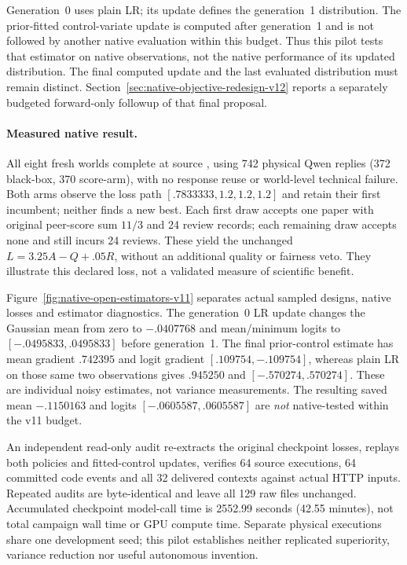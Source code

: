 Generation~0 uses plain LR; its update defines the generation~1 distribution.
The prior-fitted control-variate update is computed after generation~1 and is
not followed by another native evaluation within this budget. Thus this pilot
tests that estimator on native observations, not the native performance of its
updated distribution. The final computed update and the last evaluated
distribution must remain distinct. Section~\ref{sec:native-objective-redesign-v12}
reports a separately budgeted forward-only followup of that final proposal.

\paragraph{Measured native result.}
All eight fresh worlds complete at source , using 742 physical
Qwen replies (372 black-box, 370 score-arm), with no response reuse or
world-level technical failure. Both arms observe the loss path
$[.7833333,1.2,1.2,1.2]$ and retain their first incumbent; neither finds a new
best. Each first draw accepts one paper with original peer-score sum $11/3$
and 24 review records; each remaining draw accepts none and still incurs 24
reviews. These yield the unchanged $L=3.25A-Q+.05R$, without an additional
quality or fairness veto. They illustrate this declared loss, not a validated
measure of scientific benefit.

Figure~\ref{fig:native-open-estimators-v11} separates actual sampled designs,
native losses and estimator diagnostics. The generation~0 LR update changes
the Gaussian mean from zero to $-.0407768$ and mean/minimum logits to
$[-.0495833,.0495833]$ before generation~1. The final prior-control estimate
has mean gradient $.742395$ and logit gradient $[.109754,-.109754]$, whereas
plain LR on those same two observations gives $.945250$ and
$[-.570274,.570274]$. These are individual noisy estimates, not variance
measurements. The resulting saved mean $-.1150163$ and logits
$[-.0605587,.0605587]$ are \emph{not} native-tested within the v11 budget.

An independent read-only audit re-extracts the original checkpoint losses,
replays both policies and fitted-control updates, verifies 64 source executions,
64 committed code events and all 32 delivered contexts against actual HTTP
inputs. Repeated audits are byte-identical and leave all 129 raw files
unchanged. Accumulated checkpoint model-call time is 2552.99 seconds
(42.55 minutes), not total campaign wall time or GPU compute time. Separate
physical executions share one development seed; this pilot establishes neither
replicated superiority, variance reduction nor useful autonomous invention.

